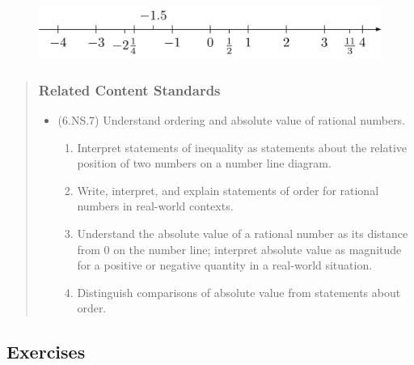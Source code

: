 \documentclass[
]{book}
\providecommand{\tightlist}{%
  \setlength{\itemsep}{0pt}\setlength{\parskip}{0pt}}
\theoremstyle{definition}
\theoremstyle{definition}
\theoremstyle{definition}
\theoremstyle{remark}
\begin{document}
\begin{figure}

{\centering \includegraphics[width=0.6\linewidth]{tikz/number-line-rationals} 

}

\end{figure}

\begin{quote}
\hypertarget{related-content-standards-14}{%
\subsubsection*{Related Content Standards}\label{related-content-standards-14}}

\begin{itemize}
\tightlist
\item
  (6.NS.7) Understand ordering and absolute value of rational numbers.

  \begin{enumerate}
  \def\labelenumi{\alph{enumi}.}
  \tightlist
  \item
    Interpret statements of inequality as statements about the relative position of two numbers on a number line diagram.
  \item
    Write, interpret, and explain statements of order for rational numbers in real-world contexts.
  \item
    Understand the absolute value of a rational number as its distance from 0 on the number line; interpret absolute value as magnitude for a positive or negative quantity in a real-world situation.
  \item
    Distinguish comparisons of absolute value from statements about order.
  \end{enumerate}
\end{itemize}
\end{quote}

\hypertarget{exercises-13}{%
\subsection{Exercises}\label{exercises-13}}
\end{document}
